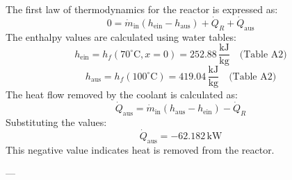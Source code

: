 The first law of thermodynamics for the reactor is expressed as:  
\[
0 = \dot{m}_{\text{in}} (h_{\text{ein}} - h_{\text{aus}}) + \dot{Q}_R + \dot{Q}_{\text{aus}}
\]  
The enthalpy values are calculated using water tables:  
\[
h_{\text{ein}} = h_f(70^\circ \text{C}, x = 0) = 252.88 \, \frac{\text{kJ}}{\text{kg}} \quad \text{(Table A2)}
\]  
\[
h_{\text{aus}} = h_f(100^\circ \text{C}) = 419.04 \, \frac{\text{kJ}}{\text{kg}} \quad \text{(Table A2)}
\]  
The heat flow removed by the coolant is calculated as:  
\[
\dot{Q}_{\text{aus}} = \dot{m}_{\text{in}} (h_{\text{aus}} - h_{\text{ein}}) - \dot{Q}_R
\]  
Substituting the values:  
\[
\dot{Q}_{\text{aus}} = -62.182 \, \text{kW}
\]  
This negative value indicates heat is removed from the reactor.

---